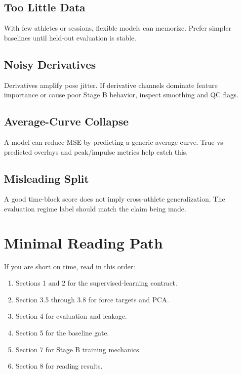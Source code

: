 \documentclass[11pt]{article}
\begin{document}
\subsection{Too Little Data}
With few athletes or sessions, flexible models can memorize. Prefer simpler
baselines until held-out evaluation is stable.

\subsection{Noisy Derivatives}
Derivatives amplify pose jitter. If derivative channels dominate feature
importance or cause poor Stage B behavior, inspect smoothing and QC flags.

\subsection{Average-Curve Collapse}
A model can reduce MSE by predicting a generic average curve. True-vs-predicted
overlays and peak/impulse metrics help catch this.

\subsection{Misleading Split}
A good time-block score does not imply cross-athlete generalization. The
evaluation regime label should match the claim being made.

\section{Minimal Reading Path}

If you are short on time, read in this order:
\begin{enumerate}[leftmargin=*]
  \item Sections 1 and 2 for the supervised-learning contract.
  \item Section 3.5 through 3.8 for force targets and PCA.
  \item Section 4 for evaluation and leakage.
  \item Section 5 for the baseline gate.
  \item Section 7 for Stage B training mechanics.
  \item Section 8 for reading results.
\end{enumerate}
\end{document}
